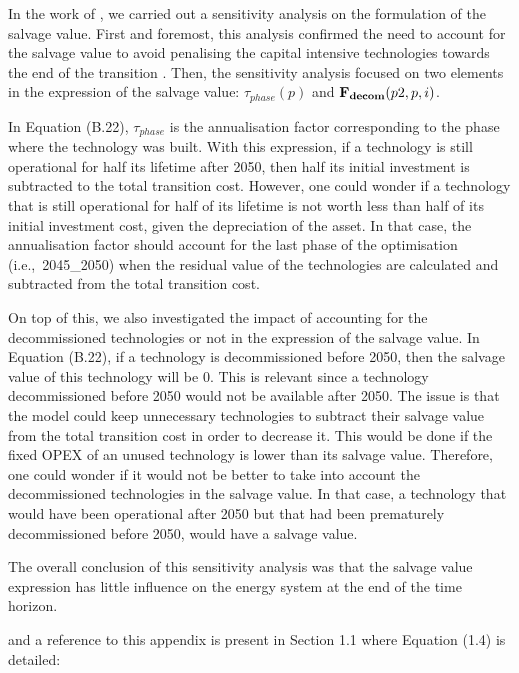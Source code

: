 \documentclass[12pt,a4paper]{article}
\def\ie{i.e.,\ }
\begin{document}
\begin{mdframed}[style=manuscript] %
In the work of \citet{goffauxpathway}, we carried out a sensitivity analysis on the formulation of the salvage value. First and foremost, this analysis confirmed the need to account for the salvage value to avoid penalising the capital intensive technologies towards the end of the transition \cite{poncelet2016myopic}. Then, the sensitivity analysis focused on two elements in the expression of the salvage value: $\tau_{phase}(p)$ and $\textbf{F\textsubscript{decom}}(p2,p,i)$. 

In Equation (B.22), $\tau_{phase}$ is the annualisation factor corresponding to the phase where the technology was built. With this expression, if a technology is still operational for half its lifetime after 2050, then half its initial investment is subtracted to the total transition cost. However, one could wonder if a technology that is still operational for half of its lifetime is not worth less than half of its initial investment cost, given the depreciation of the asset. In that case, the annualisation factor should account for the last phase of the optimisation (\ie 2045\_2050) when the residual value of the technologies are calculated and subtracted from the total transition cost. 

On top of this, we also investigated the impact of accounting for the decommissioned technologies or not in the expression of the salvage value.  In Equation (B.22), if a technology is decommissioned before 2050, then the salvage value of this technology will be 0. This is relevant since a technology decommissioned before 2050 would not be available after 2050. The issue is that the model could keep unnecessary technologies to subtract their salvage value from the total transition cost in order to decrease it. This would be done if the fixed OPEX of an unused technology is lower than its salvage value. Therefore, one could wonder if it would not be better to take into account the decommissioned technologies in the salvage value. In that case, a technology that would have been operational after 2050 but that had been prematurely decommissioned before 2050, would have a salvage value.

The overall conclusion of this sensitivity analysis was that the salvage value expression has little influence on the energy system at the end of the time horizon. 
\end{mdframed}

\noindent and a reference to this appendix is present {\color{blue}in Section 1.1 where Equation (1.4) is detailed}:
\end{document}
